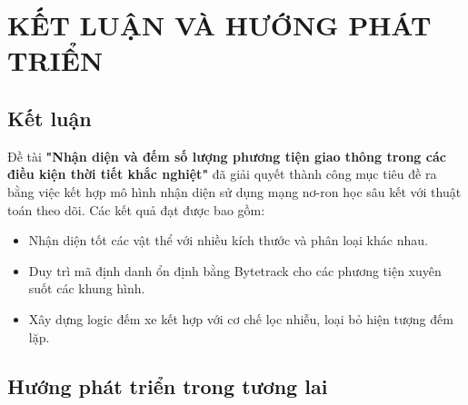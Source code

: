 
\chapter{KẾT LUẬN VÀ HƯỚNG PHÁT TRIỂN} %

\label{Chapter5} %


\section{Kết luận}

Đề tài \textbf{"Nhận diện và đếm số lượng phương tiện giao thông trong các điều kiện thời tiết khắc nghiệt"} đã giải quyết thành công mục tiêu đề ra bằng việc kết hợp mô hình nhận diện sử dụng mạng nơ-ron học sâu kết với thuật toán theo dõi. Các kết quả đạt được bao gồm:
\begin{itemize}
	\item Nhận diện tốt các vật thể với nhiều kích thước và phân loại khác nhau.
	
	\item Duy trì mã định danh ổn định bằng Bytetrack cho các phương tiện xuyên suốt các khung hình.
	
	\item Xây dựng logic đếm xe kết hợp với cơ chế lọc nhiễu, loại bỏ hiện tượng đếm lặp.
\end{itemize}

\section{Hướng phát triển trong tương lai}


